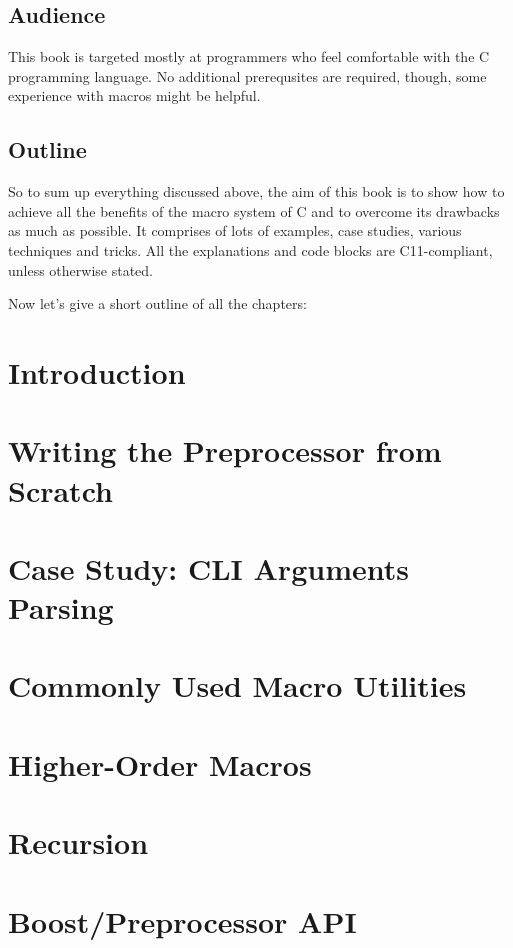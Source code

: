 \documentclass[a4paper, 12pt]{book}
\begin{document}
\section{Audience}

This book is targeted mostly at programmers who feel comfortable with the C programming
language. No additional prerequsites are required, though, some experience with macros might
be helpful.

\newpage

\section{Outline}

So to sum up everything discussed above, the aim of this book is to show how to achieve all
the benefits of the macro system of C and to overcome its drawbacks as much as possible. It
comprises of lots of examples, case studies, various techniques and tricks. All the
explanations and code blocks are C11-compliant, unless otherwise stated.

Now let's give a short outline of all the chapters:

\newpage

\chapter{Introduction}
\chapter{Writing the Preprocessor from Scratch}
\chapter{Case Study: CLI Arguments Parsing}
\chapter{Commonly Used Macro Utilities}
\chapter{Higher-Order Macros}
\chapter{Recursion}
\chapter{Boost/Preprocessor API}
\end{document}
